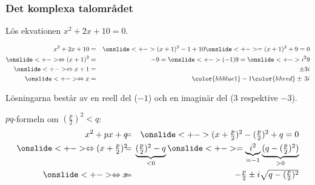 \documentclass[slidestop,blue,handout,9pt]{beamer}
\begin{document}
\begin{frame}
\frametitle{Det komplexa talområdet}
\begin{exempel}
Lös ekvationen $x^2 + 2x + 10 = 0$.
\onslide<+->
\begin{losning}
\vspace{-0.5cm}
\begin{eqnarray*}
x^2 + 2x + 10 &=& \onslide<+-> (x+1)^2 - 1 + 10 
\onslide<+->
= (x+1)^2 + 9 = 0 \\
\onslide<+->
\Leftrightarrow (x+1)^2 &=& -9 = \onslide<+-> (-1)9 = \onslide<+-> i^29 \\
\onslide<+->
\Leftrightarrow x + 1 &=&
\pm 3i \\
\onslide<+->
\Leftrightarrow x &=& {\color{hhblue1}-1} {\color{hhred} \pm \,3}i
\end{eqnarray*}
\end{losning}
\end{exempel}
\onslide<+->
Lösningarna består av en reell del ({\color{hhblue1}$-1$}) och en
imaginär del ({\color{hhred}$3$} respektive {\color{hhred}$-3$}). 
\begin{anm}
$pq$-formeln om $(\frac{p}{2})^2 < q$:
\begin{eqnarray*}
x^2+px+q \mkern-10mu &=& \mkern-10mu \onslide<+-> \textstyle (x+\frac{p}{2})^2 -(\frac{p}{2})^2+q = 0\\
\onslide<+->
\Leftrightarrow \textstyle (x+\frac{p}{2})^2 
\mkern-10mu &= &\mkern-10mu \underbrace{\textstyle (\frac{p}{2})^2-q}_{<0}
\onslide<+-> 
= \underbrace{i^2}_{=-1}\underbrace{\textstyle (q-(\frac{p}{2})^2)}_{>0}\\
\onslide<+->
\Leftrightarrow 
x \mkern-10mu &=& \mkern-10mu \textstyle-\frac{p}{2} \pm i\sqrt{q-(\frac{p}{2})^2}
\end{eqnarray*}
\end{anm}
\end{frame}
\end{document}
